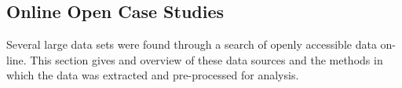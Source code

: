 \subsection{Online Open Case Studies}

Several large data sets were found through a search of openly accessible data on-line. This section gives and overview of these data sources and the methods in which the data was extracted and pre-processed for analysis.
